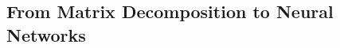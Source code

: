 %
%



\subsection{From Matrix Decomposition to Neural Networks}
\label{subsection:ch4-from_matrix_decomposition_to_neural_networks}


